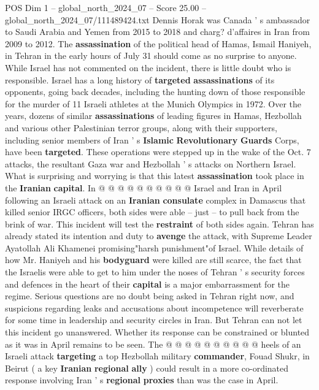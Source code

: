\begin{textsample}{POS Dim 1 – global\_north\_2024\_07 – Score 25.00 – global\_north\_2024\_07/111489424.txt}  \label{ex:f1_pos_184}
Dennis Horak was Canada ' s ambassador to Saudi Arabia and Yemen from 2015 to 2018 and charg? d'affaires in Iran from 2009 to 2012.
The \textbf{assassination} of the political head of Hamas, Ismail Haniyeh, in Tehran in the early hours of July 31 should come as no surprise to anyone.
While Israel has not commented on the incident, there is little doubt who is responsible.
Israel has a long history of \textbf{targeted} \textbf{assassinations} of its opponents, going back decades, including the hunting down of those responsible for the murder of 11 Israeli athletes at the Munich Olympics in 1972.
Over the years, dozens of similar \textbf{assassinations} of leading figures in Hamas, Hezbollah and various other Palestinian terror groups, along with their supporters, including senior members of Iran ' s \textbf{Islamic} \textbf{Revolutionary} \textbf{Guards} Corps, have been \textbf{targeted}.
These operations were stepped up in the wake of the Oct. 7 attacks, the resultant Gaza war and Hezbollah ' s attacks on Northern Israel.
What is surprising and worrying is that this latest \textbf{assassination} took place in the \textbf{Iranian} \textbf{capital}.
In @ @ @ @ @ @ @ @ @ @ Israel and Iran in April following an Israeli attack on an \textbf{Iranian} \textbf{consulate} complex in Damascus that killed senior IRGC officers, both sides were able -- just -- to pull back from the brink of war.
This incident will test the \textbf{restraint} of both sides again.
Tehran has already stated its intention and duty to \textbf{avenge} the attack, with Supreme Leader Ayatollah Ali Khamenei promising"harsh punishment"of Israel.
While details of how Mr.
Haniyeh and his \textbf{bodyguard} were killed are still scarce, the fact that the Israelis were able to get to him under the noses of Tehran ' s security forces and defences in the heart of their \textbf{capital} is a major embarrassment for the regime.
Serious questions are no doubt being asked in Tehran right now, and suspicions regarding leaks and accusations about incompetence will reverberate for some time in leadership and security circles in Iran.
But Tehran can not let this incident go unanswered.
Whether its response can be constrained or blunted as it was in April remains to be seen.
The @ @ @ @ @ @ @ @ @ @ heels of an Israeli attack \textbf{targeting} a top Hezbollah military \textbf{commander}, Fouad Shukr, in Beirut ( a key \textbf{Iranian} \textbf{regional} \textbf{ally} ) could result in a more co-ordinated response involving Iran ' s \textbf{regional} \textbf{proxies} than was the case in April.

\end{textsample}
